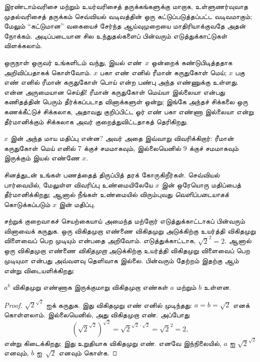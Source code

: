 \documentclass[../../../include/open-logic-section]{subfiles}
\begin{document}



இரண்டாம்வரிசை மற்றும் உயர்வரிசைத் தருக்கங்களுக்கு மாறாக,
உள்ளுணர்வுவாத முதல்வரிசைத் தருக்கம் செவ்வியல் வடிவத்தின் ஒரு
கட்டுப்படுத்தப்பட்ட வடிவமாகும்; மேலும் ``கட்டுமான'' வகையைச் சேர்ந்த
ஆய்வுமுறையை மாதிரியாக்குவதே அதன் நோக்கம். அடிப்படையான சில
உந்துதல்களைப் பின்வரும் எடுத்துக்காட்டுகள் விளக்கலாம்.

ஒருநாள் ஒருவர் உங்களிடம் வந்து, இயல் எண்~$x$ ஒன்றைக் கண்டுபிடித்ததாக
அறிவிப்பதாகக் கொள்வோம். $x$ பகா எண் எனில் ரீமான் கருதுகோள் மெய்;
$x$ பகு எண் எனில் ரீமான் கருதுகோள் பொய் என்ற பண்பு அந்த எண்ணுக்கு
உள்ளது. என்ன அருமையான செய்தி!{} ரீமான் கருதுகோள் மெய்யா இல்லையா என்பது
கணிதத்தின் பெரும் தீர்க்கப்படாத வினாக்களுள் ஒன்று; இங்கே அந்தச் சிக்கலை
ஒரு கணக்கீட்டுச் சிக்கலாக, அதாவது குறிப்பிட்ட ஓர் எண் பகா எண்ணா
இல்லையா என்று தீர்மானிக்கும் சிக்கலாக அவர் குறைத்துவிட்டதாகத் தெரிகிறது.

$x$ இன் அந்த மாய மதிப்பு என்ன? அவர் அதை இவ்வாறு விவரிக்கிறார்:
ரீமான் கருதுகோள் மெய் எனில் $7$ க்குச் சமமாகவும், இல்லையெனில்
$9$ க்குச் சமமாகவும் இருக்கும் இயல் எண்ணே $x$.

சினத்துடன் உங்கள் பணத்தைத் திருப்பித் தரக் கோருகிறீர்கள். செவ்வியல்
பார்வையில், மேலுள்ள விவரிப்பு உண்மையிலேயே $x$ இன் ஒரேயொரு மதிப்பைத்
தீர்மானிக்கிறது; ஆனால் நீங்கள் உண்மையில் விரும்புவது
\emph{வெளிப்படையாகக்} கொடுக்கப்படும் $x$ இன் மதிப்பு.

சற்றுக் குறைவாகச் செயற்கையாய் அமைந்த மற்றோர் எடுத்துக்காட்டாகப் பின்வரும்
வினாவைக் கருதுக. ஒரு விகிதமுறா எண்ணை விகிதமுறு அடுக்கிற்கு உயர்த்தி
விகிதமுறு விளைவைப் பெற முடியும் என்பதை அறிவோம். எடுத்துக்காட்டாக,
$\sqrt{2}^2 = 2$. ஆனால் ஒரு விகிதமுறா எண்ணை \emph{விகிதமுறா}
அடுக்கிற்கு உயர்த்தி விகிதமுறு விளைவைப் பெற முடியுமா என்பது அவ்வளவு
தெளிவாக இல்லை. பின்வரும் தேற்றம் இதற்கு ஆம் என்று விடையளிக்கிறது:

\begin{thm}
$a^b$ விகிதமுறு எண்ணாக இருக்குமாறு விகிதமுறா எண்கள் $a$ மற்றும் $b$
உள்ளன.
\end{thm}

\begin{proof}
$\sqrt{2}^{\sqrt{2}}$ ஐக் கருதுக. இது விகிதமுறு எண் எனில் முடிந்தது:
$a = b = \sqrt{2}$ எனக் கொள்ளலாம். இல்லையெனில், அது விகிதமுறா எண்.
அப்போது
\[
(\sqrt{2}^{\sqrt{2}})^{\sqrt{2}} = \sqrt{2}^{\sqrt{2} \cdot
  \sqrt{2}} = \sqrt{2}^2 = 2,
\]
என்று கிடைக்கிறது; இது உறுதியாக விகிதமுறு எண். எனவே இந்நிலையில்,
$a$ ஐ $\sqrt{2}^{\sqrt{2}}$ எனவும், $b$ ஐ~$\sqrt 2$ எனவும் கொள்க.
\end{proof}
\end{document}
